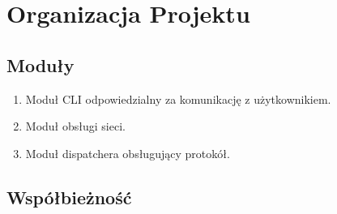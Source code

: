 \documentclass[11pt,oneside]{book}
\newcommand{\+}{\discretionary{\mbox{\scriptsize$\hookleftarrow$}}{}{}}
\begin{document}
\chapter{Organizacja Projektu}
\section{Moduły}
\begin{enumerate}
\item
Moduł CLI odpowiedzialny za komunikację z użytkownikiem.
\item
Moduł obsługi sieci.
\item
Moduł dispatchera obsługujący protokół.
\end{enumerate}
\section{Współbieżność}
\end{document}
